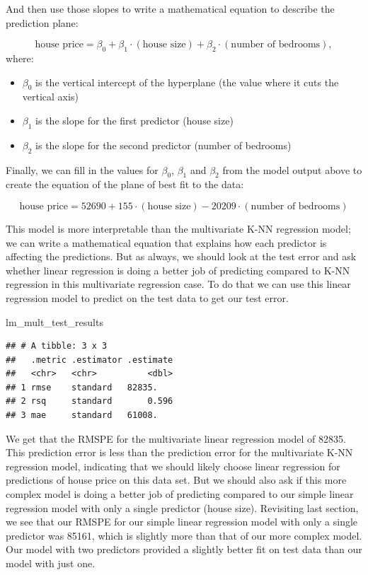 \documentclass[
]{krantz}
\makeatletter
\newenvironment{Shaded}{\begin{snugshade}}{\end{snugshade}}
\newcommand{\NormalTok}[1]{#1}
\providecommand{\tightlist}{%
  \setlength{\itemsep}{0pt}\setlength{\parskip}{0pt}}
\newenvironment{kframe}{%
\medskip{}
\setlength{\fboxsep}{.8em}
 \def\at@end@of@kframe{}%
 \ifinner\ifhmode%
  \def\at@end@of@kframe{\end{minipage}}%
  \begin{minipage}{\columnwidth}%
 \fi\fi%
 \def\FrameCommand##1{\hskip\@totalleftmargin \hskip-\fboxsep
 \colorbox{shadecolor}{##1}\hskip-\fboxsep
     \hskip-\linewidth \hskip-\@totalleftmargin \hskip\columnwidth}%
 \MakeFramed {\advance\hsize-\width
   \@totalleftmargin\z@ \linewidth\hsize
   \@setminipage}}%
 {\par\unskip\endMakeFramed%
 \at@end@of@kframe}
\renewenvironment{Shaded}{\begin{kframe}}{\end{kframe}}
\makeatother
\begin{document}
And then use those slopes to write a mathematical equation to describe the prediction plane:

\[\text{house price} = \beta_0 + \beta_1\cdot(\text{house size}) + \beta_2\cdot(\text{number of bedrooms}),\]
where:

\begin{itemize}
\tightlist
\item
  \(\beta_0\) is the vertical intercept of the hyperplane (the value where it cuts the vertical axis)
\item
  \(\beta_1\) is the slope for the first predictor (house size)
\item
  \(\beta_2\) is the slope for the second predictor (number of bedrooms)
\end{itemize}

Finally, we can fill in the values for \(\beta_0\), \(\beta_1\) and \(\beta_2\) from the model output above
to create the equation of the plane of best fit to the data:

\[\text{house price} = 52690 + 155\cdot (\text{house size})  -20209 \cdot (\text{number of bedrooms})\]

This model is more interpretable than the multivariate K-NN
regression model; we can write a mathematical equation that explains how
each predictor is affecting the predictions. But as always, we should look at
the test error and ask whether linear regression is doing a better job of
predicting compared to K-NN regression in this multivariate regression case. To
do that we can use this linear regression model to predict on the test data to
get our test error.

\begin{Shaded}
\begin{Highlighting}[]
\NormalTok{lm\_mult\_test\_results}
\end{Highlighting}
\end{Shaded}

\begin{verbatim}
## # A tibble: 3 x 3
##   .metric .estimator .estimate
##   <chr>   <chr>          <dbl>
## 1 rmse    standard   82835.   
## 2 rsq     standard       0.596
## 3 mae     standard   61008.
\end{verbatim}

We get that the RMSPE for the multivariate linear regression model
of 82835. This prediction error
is less than the prediction error for the multivariate K-NN regression model,
indicating that we should likely choose linear regression for predictions of
house price on this data set. But we should also ask if this more complex
model is doing a better job of predicting compared to our simple linear
regression model with only a single predictor (house size). Revisiting last
section, we see that our RMSPE for our simple linear regression model with
only a single predictor was
85161,
which is slightly more than that of our more complex model. Our model with two predictors
provided a slightly better fit on test data than our model with just one.
\end{document}
